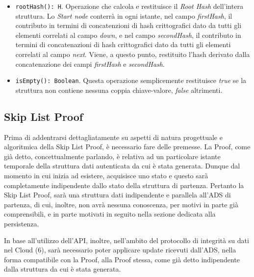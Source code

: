 \begin{itemize}
		\item \verb|rootHash(): H|. Operazione che calcola e restituisce il \textit{Root Hash} dell'intera struttura. Lo \textit{Start node} conterrà in ogni istante, nel campo \textit{firstHash}, il contributo in termini di concatenzioni di hash crittografici dato da tutti gli elementi correlati al campo \textit{down}, e nel campo \textit{secondHash}, il contributo in termini di concatenazioni di hash crittografici dato da tutti gli elementi correlati al campo \textit{next}. Viene, a questo punto, restituito l'hash derivato dalla concatenazione dei campi \textit{firstHash} e \textit{secondHash}.
			
		\item \verb|isEmpty(): Boolean|. Questa operazione semplicemente restituisce \textit{true} se la struttura non contiene nessuna coppia chiave-valore, \textit{false} altrimenti.
		
		
	\end{itemize}
	
	\subsection{Skip List Proof}
	
	

		Prima di addentrarsi dettagliatamente su aspetti di natura progettuale e algoritmica della Skip List Proof, è necessario fare delle premesse. La Proof, come già detto, concettualmente parlando, è relativa ad un particolare istante temporale della struttura dati autenticata da cui è stata generata. Dunque dal momento in cui inizia ad esistere, acquisisce uno stato e questo sarà completamente indipendente dallo stato della struttura di partenza. Pertanto la Skip List Proof, sarà una struttura dati indipendente e parallela all'ADS di partenza, di cui, inoltre, non avrà nessuna conoscenza, per motivi in parte già comprensibili, e in parte motivati in seguito nella sezione dedicata alla persistenza.

		In base all'utilizzo dell'API, inoltre, nell'ambito del protocollo di integrità su dati nel Cloud (6), sarà necessario poter applicare update ricevuti dall'ADS, nella forma compatibile con la Proof, alla Proof stessa, come già detto indipendente dalla struttura da cui è stata generata.
		
